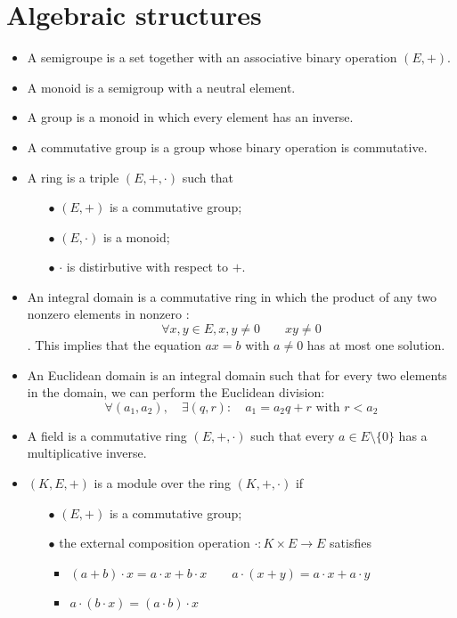 \documentclass[12pt, openany]{report}
\theoremstyle{definition}
\begin{document}
\section{Algebraic structures}
\begin{itemize}
    \item A semigroupe is a set together with an associative binary operation \((E,+)\).
    \item A monoid is a semigroup with a neutral element.
    \item A group is a monoid in which every element has an inverse.
    \item A commutative group is a group whose binary operation is commutative.
    \item A ring is a triple \((E,+,\cdot)\) such that
    \begin{itemize}
        \item [\(\bullet\)] \((E,+)\) is a commutative group;
        \item [\(\bullet\)] \((E,\cdot)\) is a monoid;
        \item [\(\bullet\)] $\cdot$ is distirbutive with respect to \(+\).
    \end{itemize}
    \item An integral domain is a commutative ring in which the product of any two nonzero elements in nonzero : \[\forall x,y\in E, x,y\neq 0\qquad xy\neq 0\]. This implies that the equation \(ax=b\) with \(a\neq 0\) has at most one solution. 
    \item An Euclidean domain is an integral domain such that for every two elements in the domain, we can perform the Euclidean division: \[\forall (a_1,a_2), \quad \exists (q,r) : \quad a_1=a_2q+r \text{ with }r<a_2\]
    \item A field is a commutative ring \((E,+,\cdot)\) such that every \(a\in E\setminus \{0\}\) has a multiplicative inverse.
    \item \((K,E,+)\) is a module over the ring \((K,+,\cdot)\) if 
    \begin{itemize}
        \item [\(\bullet\)] \((E,+)\) is a commutative group;
        \item [\(\bullet\)] the external composition operation \(\cdot:K\times E\rightarrow E\) satisfies 
        \begin{itemize}
            \item \((a+b)\cdot x = a\cdot x+b \cdot x \qquad a\cdot (x+y) = a\cdot x+a\cdot y\)
            \item \(a\cdot (b\cdot x) = (a\cdot b)\cdot x\)

\end{itemize}
\end{itemize}
\end{itemize}
\end{document}
